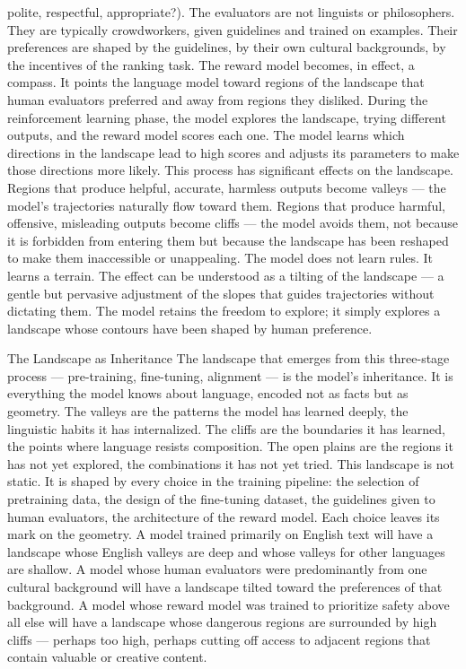 polite, respectful, appropriate?). The evaluators are not linguists or philosophers. They are typically crowdworkers, given guidelines and trained on examples. Their preferences are shaped by the guidelines, by their own cultural backgrounds, by the incentives of the ranking task. The reward model becomes, in effect, a compass. It points the language model toward regions of the landscape that human evaluators preferred and away from regions they disliked. During the reinforcement learning phase, the model explores the landscape, trying different outputs, and the reward model scores each one. The model learns which directions in the landscape lead to high scores and adjusts its parameters to make those directions more likely. This process has significant effects on the landscape. Regions that produce helpful, accurate, harmless outputs become valleys — the model’s trajectories naturally flow toward them. Regions that produce harmful, offensive, misleading outputs become cliffs — the model avoids them, not because it is forbidden from entering them but because the landscape has been reshaped to make them inaccessible or unappealing. The model does not learn rules. It learns a terrain. The effect can be understood as a tilting of the landscape — a gentle but pervasive adjustment of the slopes that guides trajectories without dictating them. The model retains the freedom to explore; it simply explores a landscape whose contours have been shaped by human preference.

The Landscape as Inheritance The landscape that emerges from this three-stage process — pre-training, fine-tuning, alignment — is the model’s inheritance. It is everything the model knows about language, encoded not as facts but as geometry. The valleys are the patterns the model has learned deeply, the linguistic habits it has internalized. The cliffs are the boundaries it has learned, the points where language resists composition. The open plains are the regions it has not yet explored, the combinations it has not yet tried. This landscape is not static. It is shaped by every choice in the training pipeline: the selection of pretraining data, the design of the fine-tuning dataset, the guidelines given to human evaluators, the architecture of the reward model. Each choice leaves its mark on the geometry. A model trained primarily on English text will have a landscape whose English valleys are deep and whose valleys for other languages are shallow. A model whose human evaluators were predominantly from one cultural background will have a landscape tilted toward the preferences of that background. A model whose reward model was trained to prioritize safety above all else will have a landscape whose dangerous regions are surrounded by high cliffs — perhaps too high, perhaps cutting off access to adjacent regions that contain valuable or creative content.

